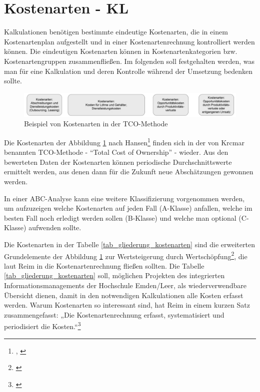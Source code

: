 
\section{Kostenarten - KL}

\label{section_kostenarten}
Kalkulationen benötigen bestimmte eindeutige Kostenarten, die in einem Kostenartenplan aufgestellt und in einer Kostenartenrechnung kontrolliert werden können. Die eindeutigen Kostenarten können in Kostenartenkategorien bzw. Kostenartengruppen zusammenfließen. Im folgenden soll festgehalten werden, was man für eine Kalkulation und deren Kontrolle w\"ahrend der Umsetzung bedenken sollte.

\begin{figure}[h!]
	\centering
	\includegraphics[width=\textwidth]{kapitel/gruppe4_2/bilder/beispiel_kostenarten_TCO}
	\caption{Beispiel von Kostenarten in der TCO-Methode}
	\label{fig_kostenarten_TCO}
\end{figure}

Die Kostenarten der Abbildung \ref{fig_kostenarten_TCO} nach Hansen\footnote{\autocite[495]{hansen_business_2009}, \autocite[Vgl.][314, 355]{muller2013betriebswirtschaftslehre}} finden sich in der von Krcmar benannten TCO-Methode - \enquote{Total Cost of Ownership} - wieder. Aus den bewerteten Daten der Kostenarten können periodische Durchschnittswerte ermittelt werden, aus denen dann für die Zukunft neue Abschätzungen gewonnen werden.

\clearpage

In einer ABC-Analyse kann eine weitere Klassifizierung vorgenommen werden, um aufzuzeigen welche Kostenarten auf jeden Fall (A-Klasse) anfallen, welche im besten Fall noch erledigt werden sollen (B-Klasse) und welche man optional (C-Klasse) aufwenden sollte.

Die Kostenarten in der Tabelle \ref{tab_gliederung_kostenarten} sind die erweiterten Grundelemente der Abbildung \ref{fig_kostenarten_TCO} zur Wertsteigerung durch Wertschöpfung\footnote{\autocite[125-128]{reim_erfolgsrechnung_2015}}, die laut Reim in die Kostenartenrechnung fließen sollten. Die Tabelle \ref{tab_gliederung_kostenarten} soll, m\"oglichen Projekten des integrierten Informationsmanagements der Hochschule Emden/Leer, als wiederverwendbare Übersicht dienen, damit in den notwendigen Kalkulationen alle Kosten erfasst werden. Warum Kostenarten so interessant sind, hat Reim in einem kurzen Satz zusammengefasst: „Die Kostenartenrechnung erfasst, systematisiert und periodisiert die Kosten.“\footnote{\autocite[137-147]{reim_erfolgsrechnung_2015}} 

